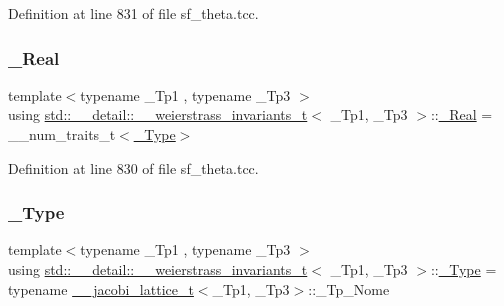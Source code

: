 Definition at line 831 of file sf\+\_\+theta.\+tcc.

\mbox{\label{structstd_1_1____detail_1_1____weierstrass__invariants__t_a7990bba8f3b3d155a80d051c86de1460}} 
\subsubsection{\texorpdfstring{\+\_\+\+Real}{\_Real}}
{\footnotesize\ttfamily template$<$typename \+\_\+\+Tp1 , typename \+\_\+\+Tp3 $>$ \\
using \hyperlink{structstd_1_1____detail_1_1____weierstrass__invariants__t}{std\+::\+\_\+\+\_\+detail\+::\+\_\+\+\_\+weierstrass\+\_\+invariants\+\_\+t}$<$ \+\_\+\+Tp1, \+\_\+\+Tp3 $>$\+::\hyperlink{structstd_1_1____detail_1_1____weierstrass__invariants__t_a7990bba8f3b3d155a80d051c86de1460}{\+\_\+\+Real} =  \+\_\+\+\_\+num\+\_\+traits\+\_\+t$<$\hyperlink{structstd_1_1____detail_1_1____weierstrass__invariants__t_a9992ab3f07a514203487c0760d76173f}{\+\_\+\+Type}$>$}



Definition at line 830 of file sf\+\_\+theta.\+tcc.

\mbox{\label{structstd_1_1____detail_1_1____weierstrass__invariants__t_a9992ab3f07a514203487c0760d76173f}} 
\subsubsection{\texorpdfstring{\+\_\+\+Type}{\_Type}}
{\footnotesize\ttfamily template$<$typename \+\_\+\+Tp1 , typename \+\_\+\+Tp3 $>$ \\
using \hyperlink{structstd_1_1____detail_1_1____weierstrass__invariants__t}{std\+::\+\_\+\+\_\+detail\+::\+\_\+\+\_\+weierstrass\+\_\+invariants\+\_\+t}$<$ \+\_\+\+Tp1, \+\_\+\+Tp3 $>$\+::\hyperlink{structstd_1_1____detail_1_1____weierstrass__invariants__t_a9992ab3f07a514203487c0760d76173f}{\+\_\+\+Type} =  typename \hyperlink{structstd_1_1____detail_1_1____jacobi__lattice__t}{\+\_\+\+\_\+jacobi\+\_\+lattice\+\_\+t}$<$\+\_\+\+Tp1, \+\_\+\+Tp3$>$\+::\+\_\+\+Tp\+\_\+\+Nome}



